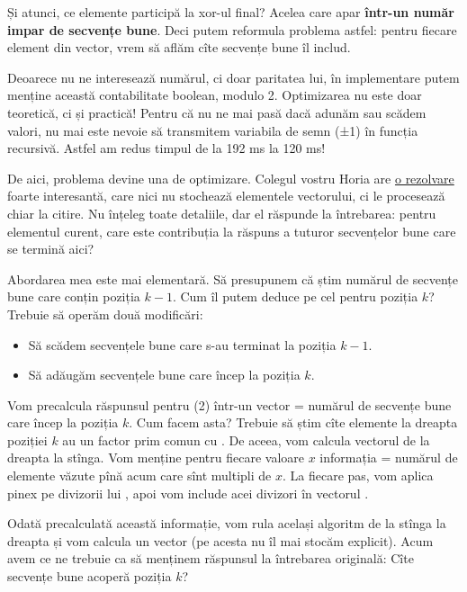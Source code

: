 \documentclass[../main.tex]{subfiles}
\begin{document}
Și atunci, ce elemente participă la xor-ul final? Acelea care apar \textbf{într-un număr impar de secvențe bune}. Deci putem reformula problema astfel: pentru fiecare element din vector, vrem să aflăm cîte secvențe bune îl includ.

Deoarece nu ne interesează numărul, ci doar paritatea lui, în implementare putem menține această contabilitate boolean, modulo 2. Optimizarea nu este doar teoretică, ci și practică! Pentru că nu ne mai pasă dacă adunăm sau scădem valori, nu mai este nevoie să transmitem variabila de semn (±1) în funcția recursivă. Astfel am redus timpul de la 192 ms la 120 ms!

De aici, problema devine una de optimizare. Colegul vostru Horia are \href{https://kilonova.ro/submissions/417274}{o rezolvare} foarte interesantă, care nici nu stochează elementele vectorului, ci le procesează chiar la citire. Nu înțeleg toate detaliile, dar el răspunde la întrebarea: pentru elementul curent, care este contribuția la răspuns a tuturor secvențelor bune care se termină aici?

Abordarea mea este mai elementară. Să presupunem că știm numărul de secvențe bune care conțin poziția $k-1$. Cum îl putem deduce pe cel pentru poziția $k$? Trebuie să operăm două modificări:

\begin{itemize}
  \item Să scădem secvențele bune care s-au terminat la poziția $k-1$.
  \item Să adăugăm secvențele bune care încep la poziția $k$.
\end{itemize}

Vom precalcula răspunsul pentru (2) într-un vector  = numărul de secvențe bune care încep la poziția $k$. Cum facem asta? Trebuie să știm cîte elemente la dreapta poziției $k$ au un factor prim comun cu . De aceea, vom calcula vectorul  de la dreapta la stînga. Vom menține pentru fiecare valoare $x$ informația  = numărul de elemente văzute pînă acum care sînt multipli de $x$. La fiecare pas, vom aplica pinex pe divizorii lui , apoi vom include acei divizori în vectorul .

Odată precalculată această informație, vom rula același algoritm de la stînga la dreapta și vom calcula un vector  (pe acesta nu îl mai stocăm explicit). Acum avem ce ne trebuie ca să menținem răspunsul la întrebarea originală: Cîte secvențe bune acoperă poziția $k$?
\end{document}
